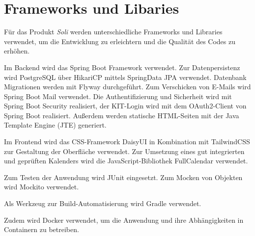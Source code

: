 \chapter{Frameworks und Libaries}
\label{ch:frameworks_libaries}

Für das Produkt \textit{Soli} werden unterschiedliche Frameworks und Libraries verwendet, um die Entwicklung zu erleichtern und die Qualität des Codes zu erhöhen.

Im Backend wird das \gls{Spring Boot} Framework verwendet.
Zur Datenpersistenz wird \gls{PostgreSQL} über HikariCP mittels \gls{SpringData} JPA verwendet.
Datenbank Migrationen werden mit \gls{Flyway} durchgeführt.
Zum Verschicken von E-Mails wird Spring Boot Mail verwendet.
Die Authentifizierung und Sicherheit wird mit Spring Boot Security realisiert, der KIT-Login wird mit dem OAuth2-Client von Spring Boot realisiert.
Außerdem werden statische \gls{HTML}-Seiten mit der Java Template Engine (JTE) generiert.

Im Frontend wird das \gls{CSS}-Framework \gls{DaisyUI} in Kombination mit TailwindCSS zur Gestaltung der Oberfläche verwendet.
Zur Umsetzung eines gut integrierten und geprüften Kalenders wird die \gls{JavaScript}-Bibliothek \gls{FullCalendar} verwendet.

Zum Testen der Anwendung wird \gls{JUnit} eingesetzt.
Zum Mocken von Objekten wird \gls{Mockito} verwendet.

Als Werkzeug zur Build-Automatisierung wird \gls{Gradle} verwendet.

Zudem wird \gls{Docker} verwendet, um die Anwendung und ihre Abhängigkeiten in \gls{Container}n zu betreiben.